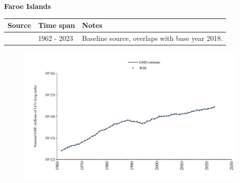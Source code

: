\documentclass[12pt,a4paper,landscape]{article}
\begin{document}
\begin{adjustbox}{max totalsize={\paperwidth}{\paperheight},center}
\begin{minipage}[t][\textheight][t]{\textwidth}
\vspace*{0.5cm}
{}
\begin{center}
{\Large\bfseries Faroe Islands}
\end{center}
\vspace{0.5cm}
\begin{table}[H]
\centering
\small
\begin{tabular}{|l|l|l|}
\hline
\textbf{Source} & \textbf{Time span} & \textbf{Notes} \\
\hline
\rowcolor{white}\cite{WDI}& 1962 - 2023 &Baseline source, overlaps with base year 2018.\\
\hline
\end{tabular}
\end{table}
\begin{figure}[H]
\centering
\includegraphics[width=\textwidth,height=0.6\textheight,keepaspectratio]{graphs/FRO_nGDP.pdf}
\end{figure}
\end{minipage}
\end{adjustbox}
\end{document}
